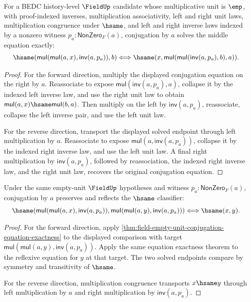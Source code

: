 \begin{theorem}
\label{thm:field-empty-unit-conjugation-equation-exactness}
For a BEDC history-level $\FieldUp$ candidate whose multiplicative unit is
$\emp$, with proof-indexed inverses, multiplication associativity, left and
right unit laws, multiplication congruence under $\hsame$, and left and right
inverse laws indexed by a nonzero witness $p_a:\mathsf{NonZero}_F(a)$,
conjugation by $a$ solves the middle equation exactly:
$$
\hsame(\mathsf{mul}(\mathsf{mul}(a,x),\mathsf{inv}(a,p_a)),b)
\Longleftrightarrow
\hsame(x,\mathsf{mul}(\mathsf{mul}(\mathsf{inv}(a,p_a),b),a)).
$$
\end{theorem}
\begin{proof}
For the forward direction, multiply the displayed conjugation equation on the
right by $a$. Reassociate to expose
$\mathsf{mul}(\mathsf{inv}(a,p_a),a)$, collapse it by the indexed left inverse
law, and use the right unit law to obtain
$\mathsf{mul}(a,x)\hsame\mathsf{mul}(b,a)$. Then multiply on the left by
$\mathsf{inv}(a,p_a)$, reassociate, collapse the left inverse pair, and use
the left unit law.

For the reverse direction, transport the displayed solved endpoint through
left multiplication by $a$. Reassociate to expose
$\mathsf{mul}(a,\mathsf{inv}(a,p_a))$, collapse it by the indexed right
inverse law, and use the left unit law. A final right multiplication by
$\mathsf{inv}(a,p_a)$, followed by reassociation, the indexed right inverse
law, and the right unit law, recovers the original conjugation equation.
\end{proof}

\begin{theorem}
\label{thm:field-empty-unit-conjugation-classifier-exactness}
Under the same empty-unit $\FieldUp$ hypotheses and witness
$p_a:\mathsf{NonZero}_F(a)$, conjugation by $a$ preserves and reflects the
$\hsame$ classifier:
$$
\hsame(\mathsf{mul}(\mathsf{mul}(a,x),\mathsf{inv}(a,p_a)),
\mathsf{mul}(\mathsf{mul}(a,y),\mathsf{inv}(a,p_a)))
\Longleftrightarrow
\hsame(x,y).
$$
\end{theorem}
\begin{proof}
For the forward direction, apply
\autoref{thm:field-empty-unit-conjugation-equation-exactness} to the displayed
comparison with target
$\mathsf{mul}(\mathsf{mul}(a,y),\mathsf{inv}(a,p_a))$. Apply the same
equation exactness theorem to the reflexive equation for $y$ at that target.
The two solved endpoints compare by symmetry and transitivity of $\hsame$.

For the reverse direction, multiplication congruence transports $x\hsame y$
through left multiplication by $a$ and right multiplication by
$\mathsf{inv}(a,p_a)$.
\end{proof}

